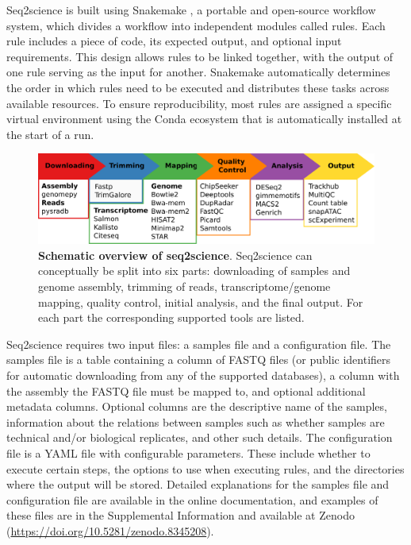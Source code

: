 Seq2science is built using Snakemake \cite{snakemake}, a portable and open-source workflow system, which divides a workflow into independent modules called rules. Each rule includes a piece of code, its expected output, and optional input requirements. This design allows rules to be linked together, with the output of one rule serving as the input for another. Snakemake automatically determines the order in which rules need to be executed and distributes these tasks across available resources. To ensure reproducibility, most rules are assigned a specific virtual environment using the Conda ecosystem \cite{anaconda} that is automatically installed at the start of a run.

\begin{figure}
	\centering
	\includegraphics[width=\textwidth]{ch.seq2science/imgs/figure_overview.png}
	\caption{\label{fig:overview} \textbf{Schematic overview of seq2science}. Seq2science can conceptually be split into six parts: downloading of samples and genome assembly, trimming of reads, transcriptome/genome mapping, quality control, initial analysis, and the final output. For each part the corresponding supported tools are listed. }
\end{figure}

Seq2science requires two input files: a samples file and a configuration file. The samples file is a table containing a column of FASTQ files (or public identifiers for automatic downloading from any of the supported databases), a column with the assembly the FASTQ file must be mapped to, and optional additional metadata columns. Optional columns are the descriptive name of the samples, information about the relations between samples such as whether samples are technical and/or biological replicates, and other such details. The configuration file is a YAML file with configurable parameters. These include whether to execute certain steps, the options to use when executing rules, and the directories where the output will be stored. Detailed explanations for the samples file and configuration file are available in the online documentation, and examples of these files are in the Supplemental Information and available at Zenodo (\url{https://doi.org/10.5281/zenodo.8345208}).

